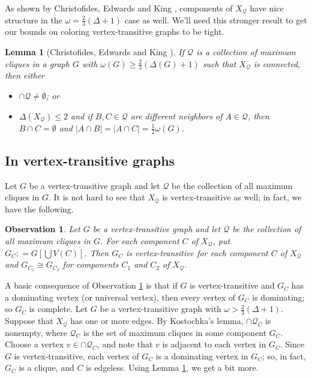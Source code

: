 \documentclass[12pt]{article}
\theoremstyle{plain}
\newtheorem{lem}[thm]{Lemma}
\newtheorem{observation}{Observation}
\theoremstyle{definition}
\theoremstyle{remark}
\newcommand{\fancy}[1]{\mathcal{#1}}
\newcommand{\card}[1]{\left|#1\right|}
\newcommand{\brackets}[1]{\left[ #1 \right]}
\newcommand{\DefinedAs}{\mathrel{\mathop:}=}
\def\Q{\fancy{Q}}
\begin{document}
As shown by Christofides, Edwards and King \cite{christofides2012note}, components of $X_\Q$ have nice structure in the $\omega = \frac23 (\Delta + 1)$ case as well.  We'll need this stronger result to get our bounds on coloring vertex-transitive graphs to be tight.

\begin{lem}[Christofides, Edwards and King \cite{christofides2012note}]\label{TwoThirdsEqualityStructure}
If $\Q$ is a collection of maximum cliques in a graph $G$ with $\omega(G) \ge \frac23 (\Delta(G) + 1)$ such that $X_\Q$ is connected, then either 
\begin{itemize}
\item $\cap \Q \ne \emptyset$; or
\item $\Delta(X_\Q) \le 2$ and if $B, C \in \Q$ are different neighbors of $A \in \Q$, then $B \cap C = \emptyset$ and $\card{A \cap B} = \card{A \cap C} = \frac12 \omega(G)$.
\end{itemize}

\end{lem}
\subsection{In vertex-transitive graphs}
Let $G$ be a vertex-transitive graph and let $\Q$ be the collection of all
maximum cliques in $G$.  It is not hard to see that $X_\Q$ is vertex-transitive
as well; in fact, we have the following.

\begin{observation}\label{transitiveClustering}
Let $G$ be a vertex-transitive graph and let $\Q$ be the collection of all
maximum cliques in $G$.  For each component $C$ of $X_\Q$, put $G_C \DefinedAs
G\brackets{\bigcup V(C)}$.  Then $G_C$ is vertex-transitive for each component
$C$ of $X_\Q$ and $G_{C_1} \cong G_{C_2}$ for components $C_1$ and $C_2$ of
$X_\Q$.
\end{observation}

A basic consequence of Observation \ref{transitiveClustering} is that if $G$ is
vertex-transitive and $G_C$ has a dominating vertex (or universal vertex), then
every vertex of $G_C$ is dominating; so $G_C$ is complete.  
Let $G$ be a vertex-transitive graph with $\omega > \frac23 (\Delta + 1)$.   
Suppose that $X_\Q$ has one or more edges.  By Kostochka's lemma, $\cap\Q_C$ is
nonempty, where $\Q_C$ is the set of maximum cliques in some component $G_C$.
Choose a vertex $v\in\cap\Q_C$, and note that $v$ is adjacent to each vertex
in $G_C$.  Since $G$ is vertex-transitive, each vertex of $G_C$ is a
dominating vertex in $G_C$; so, in fact, $G_C$ is a clique, and $C$ is
edgeless.
Using Lemma \ref{TwoThirdsEqualityStructure}, we get a bit more.
\end{document}
